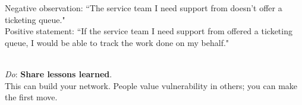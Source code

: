 Negative observation: ``The service team I need support from doesn't offer a ticketing queue."\\
Positive statement: ``If the service team I need support from offered a ticketing queue, I would be able to track the work done on my behalf."

\ \\
\textit{Do}: \textbf{Share lessons learned}.\\
This can build your network. People value vulnerability in others; you can make the first move. 